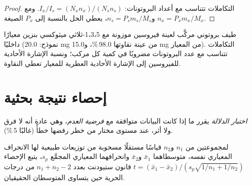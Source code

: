 \begin{proof}
التكاملات تتناسب مع أعداد البروتونات: $I_x/I_s = (N_xn_x)/(N_sn_s)$. ومع
$n_x = P_xm_x/M_x$ و$n_s = P_sm_s/M_s$، يعطي الحل بالنسبة إلى $P_x$ الصيغة.
\end{proof}

\begin{omfigure}

{\small طيف بروتوني مركَّب لعينة فيروسين موزونة مع
1،3،5-ثلاثي ميثوكسي بنزين معيارًا داخليًا (نموذج: 20.0 mg من عينة نقاوتها 98.0\,\%،
و15.0 mg من المعيار). التكاملات تتناسب مع عدد
البروتونات مضروبًا في كمية كل مركب؛ ونسبة الإشارة الأحادية للفيروسين إلى
الإشارة الأحادية العطرية للمعيار تعطي النقاوة.}
\end{omfigure}

\section{إحصاء نتيجة بحثية}

\begin{definition}\label{def:b3:lab-techniques-3:tests}
\emph{اختبار الدلالة} يقرر ما إذا كانت البيانات
متوافقة مع \emph{فرضية العدم}، وهي عادة أنه
لا فرق ولا أثر، عند مستوى مختار من خطر رفضها
خطأً (غالبًا 5\,\%).
\end{definition}

\begin{theorem}\label{thm:b3:lab-techniques-3:t-test}
لمجموعتين من $n_1$ و$n_2$ قياسًا مستقلًا مسحوبة من توزيعات
طبيعية لها الانحراف المعياري نفسه، متوسطاهما $\bar x_1$ و$\bar x_2$ وانحرافهما
المعياري المجمَّع $s_p$، يتبع الإحصاء $t = (\bar x_1 - \bar x_2)/(s_p\sqrt{1/n_1 + 1/n_2})$ قانون ستيودنت بعدد
$n_1 + n_2 - 2$ من درجات الحرية حين يتساوى المتوسطان الحقيقيان. \admitted
\end{theorem}

